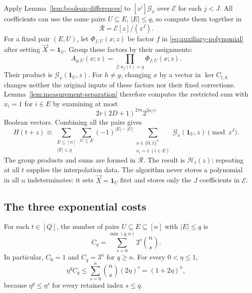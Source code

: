 Apply Lemma~\ref{lem:boolean-differences} to
$[z^j]\mathcal G_x$ over $\mathcal E$ for each $j<J$.
All coefficients can use the same pairs $U\subseteq E$, $|E|\le q$,
so compute them together in
\[
 \mathcal R=\mathcal E[z]/(z^J).
\]
For a fixed pair $(E,U)$, let $\Phi_{f,U}(x;z)$ be factor $f$
in \eqref{eq:auxiliary-polynomial} after setting $\vec X=\mathbf1_U$.
Group these factors by their assignments:
\begin{equation}\label{eq:group-polynomial}
 A_{g,U}(x;z)=\prod_{f:\sigma_f(t)=g}\Phi_{f,U}(x;z).
\end{equation}
Their product is $\mathcal G_x(\mathbf1_U,z)$.
For $h\ne g$, changing $x$ by a vector in $\ker C_{t,h}$ changes
neither the original inputs of these factors nor their fixed
corrections. Lemma~\ref{lem:measurement-separation} therefore
computes the restricted sum with $x_i=1$ for $i\in E$ by examining
at most
\begin{equation}\label{eq:boolean-enumeration}
 2r(2D+1)^{2\tau n}2^{2n/r}
\end{equation}
Boolean vectors. Combining all the pairs gives
\begin{equation}\label{eq:full-taylor-sum}
 H(t+z)\equiv
 \sum_{\substack{E\subseteq[n]\\|E|\le q}}
 \sum_{U\subseteq E}(-1)^{|E|-|U|}
 \sum_{\substack{x\in\{0,1\}^n\\x_i=1\ (i\in E)}}
       \mathcal G_x(\mathbf1_U,z)\pmod{z^J}.
\end{equation}
The group products and sums are formed in $\mathcal R$. The result is
$\mathcal H_t(z)$; repeating at all $t$ supplies the interpolation data.
The algorithm never stores a polynomial in all $n$ indeterminates:
it sets $\vec X=\mathbf1_U$ first and stores only the $J$ coefficients in $\mathcal E$.

\subsection{The three exponential costs}
\label{subsec:three-costs}
For each $t\in[Q]$,
the number of pairs $U\subseteq E\subseteq[n]$ with $|E|\le q$ is
\begin{equation}\label{eq:pair-count}
 C_q=\sum_{s=0}^{\min(q,n)}2^s\binom ns.
\end{equation}
In particular, $C_0=1$ and $C_q=3^n$ for $q\ge n$.
For every $0<\eta\le1$,
\begin{equation}\label{eq:finite-difference-cost}
 \eta^qC_q\le\sum_{s=0}^n\binom ns(2\eta)^s=(1+2\eta)^n,
\end{equation}
because $\eta^q\le\eta^s$ for every retained index $s\le q$.

